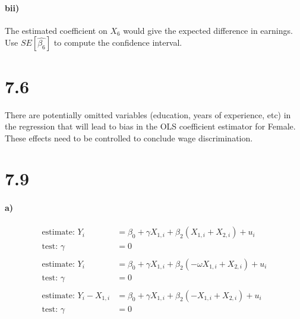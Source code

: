 \documentclass[letterpaper,12pt,titlepage,oneside,final]{book}
\begin{document}
\paragraph{bii)}
The estimated coefficient on $X_6$ would give the expected difference in earnings. Use $SE[\widehat{\beta_6}]$ to compute the confidence interval.

\section*{7.6}
\indent There are potentially omitted variables (education, years of experience, etc)  in the regression that will lead to bias in the OLS coefficient estimator for Female. These effects need to be controlled to conclude wage discrimination.
\section*{7.9}
\paragraph{a)}
\begin{align*}
\text{estimate: }Y_i &= \beta_0 + \gamma X_{1,i} + \beta_2 \left( X_{1,i} + X_{2,i} \right) + u_i\\
\text{test: }\gamma &= 0\\
\\
\text{estimate: }Y_i &= \beta_0 + \gamma X_{1,i} + \beta_2 \left( - \omega X_{1,i}+ X_{2,i}  \right) + u_i\\
\text{test: }\gamma &= 0\\
\\
\text{estimate: }Y_i - X_{1,i} &= \beta_0 + \gamma X_{1,i} + \beta_2 \left( - X_{1,i} + X_{2,i}  \right) + u_i\\
\text{test: }\gamma &= 0\\
\end{align*}
\end{document}
